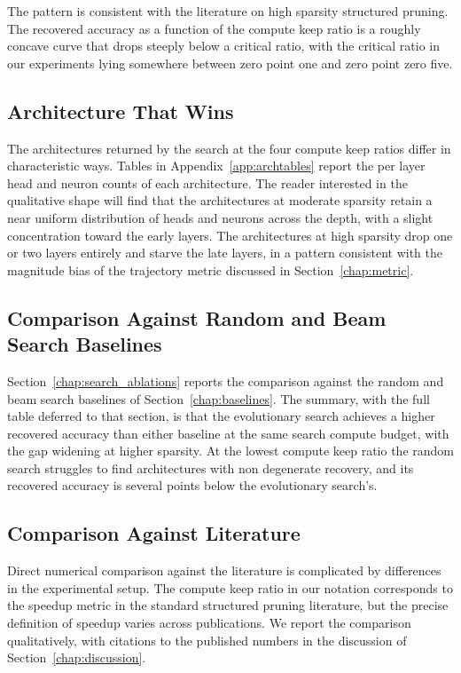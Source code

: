 The pattern is consistent with the literature on high sparsity structured pruning. The recovered accuracy as a function of the compute keep ratio is a roughly concave curve that drops steeply below a critical ratio, with the critical ratio in our experiments lying somewhere between zero point one and zero point zero five.

\subsection{Architecture That Wins}

The architectures returned by the search at the four compute keep ratios differ in characteristic ways. Tables in Appendix~\ref{app:archtables} report the per layer head and neuron counts of each architecture. The reader interested in the qualitative shape will find that the architectures at moderate sparsity retain a near uniform distribution of heads and neurons across the depth, with a slight concentration toward the early layers. The architectures at high sparsity drop one or two layers entirely and starve the late layers, in a pattern consistent with the magnitude bias of the trajectory metric discussed in Section~\ref{chap:metric}.

\subsection{Comparison Against Random and Beam Search Baselines}

Section~\ref{chap:search_ablations} reports the comparison against the random and beam search baselines of Section~\ref{chap:baselines}. The summary, with the full table deferred to that section, is that the evolutionary search achieves a higher recovered accuracy than either baseline at the same search compute budget, with the gap widening at higher sparsity. At the lowest compute keep ratio the random search struggles to find architectures with non degenerate recovery, and its recovered accuracy is several points below the evolutionary search's.

\subsection{Comparison Against Literature}

Direct numerical comparison against the literature is complicated by differences in the experimental setup. The compute keep ratio in our notation corresponds to the speedup metric in the standard structured pruning literature, but the precise definition of speedup varies across publications. We report the comparison qualitatively, with citations to the published numbers in the discussion of Section~\ref{chap:discussion}.

